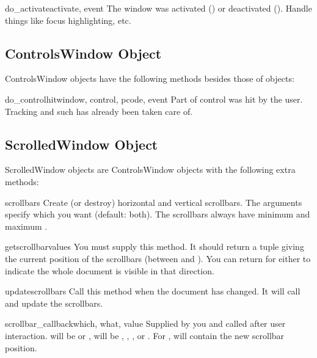 \begin{funcdesc}{do_activate}{activate, event}
The window was activated () or deactivated
(). Handle things like focus highlighting, etc.
\end{funcdesc}

\subsection{ControlsWindow Object}

ControlsWindow objects have the following methods besides those of
 objects:


\begin{funcdesc}{do_controlhit}{window, control, pcode, event}
Part  of control  was hit by the
user. Tracking and such has already been taken care of.
\end{funcdesc}

\subsection{ScrolledWindow Object}

ScrolledWindow objects are ControlsWindow objects with the following
extra methods:


\begin{funcdesc}{scrollbars}{}
Create (or destroy) horizontal and vertical scrollbars. The arguments
specify which you want (default: both). The scrollbars always have
minimum  and maximum .
\end{funcdesc}

\begin{funcdesc}{getscrollbarvalues}{}
You must supply this method. It should return a tuple 
giving the current position of the scrollbars (between  and
). You can return  for either to indicate the
whole document is visible in that direction.
\end{funcdesc}

\begin{funcdesc}{updatescrollbars}{}
Call this method when the document has changed. It will call
 and update the scrollbars.
\end{funcdesc}

\begin{funcdesc}{scrollbar_callback}{which, what, value}
Supplied by you and called after user interaction.  will
be  or ,  will be ,
, ,  or . For
,  will contain the new scrollbar position.
\end{funcdesc}


